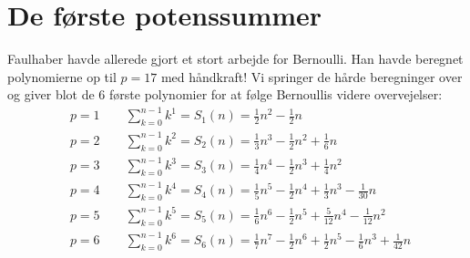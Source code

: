 \section{De første potenssummer}
Faulhaber havde allerede gjort et stort arbejde for Bernoulli. Han havde beregnet polynomierne op til \(p=17\) med håndkraft!
Vi springer de hårde beregninger over og giver blot de 6 første polynomier for at følge Bernoullis videre overvejelser:
\begin{align*}
&p=1 \qquad  \sum_{k=0}^{n-1}k^1=S_{1}(n)=\frac{1}{2}n^2-\frac{1}{2}n\\
&p=2 \qquad  \sum_{k=0}^{n-1}k^2=S_{2}(n)=\frac{1}{3}n^3-\frac{1}{2}n^2+\frac{1}{6}n\\
&p=3 \qquad  \sum_{k=0}^{n-1}k^3=S_{3}(n)=\frac{1}{4}n^4-\frac{1}{2}n^3+\frac{1}{4}n^2\\
&p=4 \qquad  \sum_{k=0}^{n-1}k^4=S_{4}(n)=\frac{1}{5}n^5-\frac{1}{2}n^4+\frac{1}{3}n^3-\frac{1}{30}n\\
&p=5 \qquad  \sum_{k=0}^{n-1}k^5=S_{5}(n)=\frac{1}{6}n^6-\frac{1}{2}n^5+\frac{5}{12}n^4-\frac{1}{12}n^2\\
&p=6 \qquad  \sum_{k=0}^{n-1}k^6=S_{6}(n)=\frac{1}{7}n^7-\frac{1}{2}n^6+\frac{1}{2}n^5-\frac{1}{6}n^3+\frac{1}{42}n\
\end{align*}
